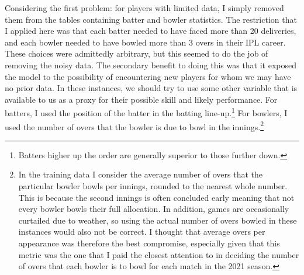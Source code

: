 Considering the first problem: for players with limited data, I simply removed them from the tables containing batter and bowler statistics. The restriction that I applied here was that each batter needed to have faced more than 20 deliveries, and each bowler needed to have bowled more than 3 overs in their IPL career. These choices were admittedly arbitrary, but this seemed to do the job of removing the noisy data. The secondary benefit to doing this was that it exposed the model to the possibility of encountering new players for whom we may have no prior data. In these instances, we should try to use some other variable that is available to us as a proxy for their possible skill and likely performance. For batters, I used the position of the batter in the batting line-up.\footnote{Batters higher up the order are generally superior to those further down.} For bowlers, I used the number of overs that the bowler is due to bowl in the innings.\footnote{In the training data I consider the average number of overs that the particular bowler bowls per innings, rounded to the nearest whole number. This is because the second innings is often concluded early meaning that not every bowler bowls their full allocation. In addition, games are occasionally curtailed due to weather, so using the actual number of overs bowled in these instances would also not be correct. I thought that average overs per appearance was therefore the best compromise, especially given that this metric was the one that I paid the closest attention to in deciding the number of overs that each bowler is to bowl for each match in the 2021 season.}

